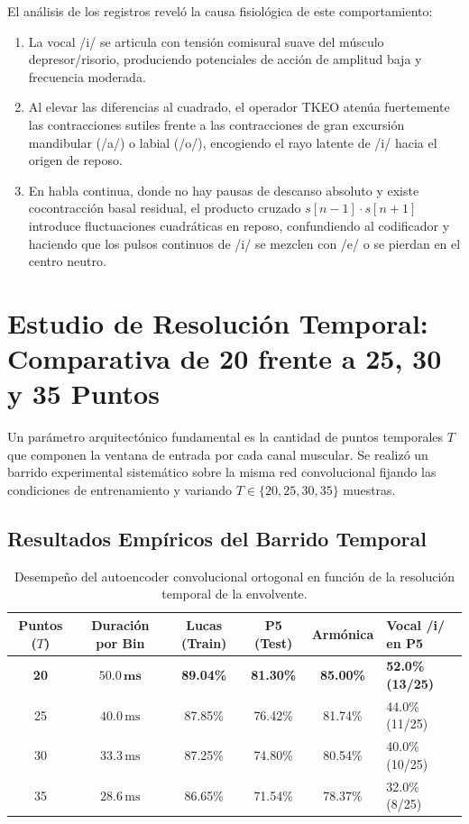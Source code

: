 \documentclass[11pt,a4paper,openany]{book}
\theoremstyle{definition}
\begin{document}
El análisis de los registros reveló la causa fisiológica de este comportamiento:
\begin{enumerate}
    \item La vocal /i/ se articula con tensión comisural suave del músculo depresor/risorio, produciendo potenciales de acción de amplitud baja y frecuencia moderada.
    \item Al elevar las diferencias al cuadrado, el operador TKEO atenúa fuertemente las contracciones sutiles frente a las contracciones de gran excursión mandibular (/a/) o labial (/o/), encogiendo el rayo latente de /i/ hacia el origen de reposo.
    \item En habla continua, donde no hay pausas de descanso absoluto y existe cocontracción basal residual, el producto cruzado $s[n-1] \cdot s[n+1]$ introduce fluctuaciones cuadráticas en reposo, confundiendo al codificador y haciendo que los pulsos continuos de /i/ se mezclen con /e/ o se pierdan en el centro neutro.
\end{enumerate}

\section{Estudio de Resolución Temporal: Comparativa de 20 frente a 25, 30 y 35 Puntos}
\label{sec:estudio_resolucion_temporal}

Un parámetro arquitectónico fundamental es la cantidad de puntos temporales $T$ que componen la ventana de entrada por cada canal muscular. Se realizó un barrido experimental sistemático sobre la misma red convolucional fijando las condiciones de entrenamiento y variando $T \in \{20, 25, 30, 35\}$ muestras.

\subsection{Resultados Empíricos del Barrido Temporal}
\label{subsec:resultados_barrido_temporal}

\begin{table}[H]
\centering
\begin{tabularx}{\textwidth}{c c c c c X}
\toprule
\textbf{Puntos ($T$)} & \textbf{Duración por Bin} & \textbf{Lucas (Train)} & \textbf{P5 (Test)} & \textbf{Armónica} & \textbf{Vocal /i/ en P5} \\
\midrule
\textbf{20} & $\mathbf{50.0\,\text{ms}}$ & \textbf{89.04\%} & \textbf{81.30\%} & \textbf{85.00\%} & \textbf{52.0\% (13/25)} \\
25 & $40.0\,\text{ms}$ & 87.85\% & 76.42\% & 81.74\% & 44.0\% (11/25) \\
30 & $33.3\,\text{ms}$ & 87.25\% & 74.80\% & 80.54\% & 40.0\% (10/25) \\
35 & $28.6\,\text{ms}$ & 86.65\% & 71.54\% & 78.37\% & 32.0\% (8/25) \\
\bottomrule
\end{tabularx}
\caption{Desempeño del autoencoder convolucional ortogonal en función de la resolución temporal de la envolvente.}
\label{tab:resolucion_temporal}
\end{table}
\end{document}

